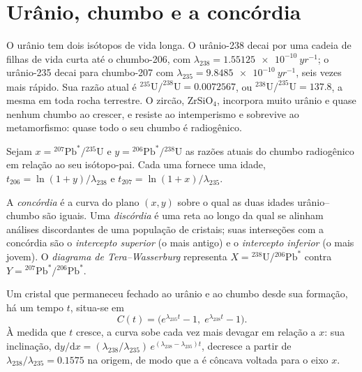 \section{Urânio, chumbo e a concórdia}\label{sec:b3:advanced-geochronology:upb}

O urânio tem dois isótopos de vida longa. O urânio-238 decai por uma cadeia de
filhas de vida curta até o chumbo-206, com $\lambda_{238} =
\qty{1.55125e-10}{yr^{-1}}$; o urânio-235 decai para chumbo-207 com $\lambda_{235}
= \qty{9.8485e-10}{yr^{-1}}$, seis vezes mais rápido. Sua razão atual é
$^{235}\mathrm{U}/^{238}\mathrm{U} = 0.0072567$, ou $^{238}\mathrm{U}/^{235}\mathrm{U}
= 137.8$, a mesma em toda rocha terrestre. O zircão, $\mathrm{ZrSiO_4}$, incorpora
muito urânio e quase nenhum chumbo ao crescer, e resiste ao intemperismo
e sobrevive ao metamorfismo: quase todo o seu chumbo é radiogênico.

Sejam $x = {}^{207}\mathrm{Pb}^*/{}^{235}\mathrm{U}$ e $y =
{}^{206}\mathrm{Pb}^*/{}^{238}\mathrm{U}$ as razões atuais do chumbo radiogênico
em relação ao seu isótopo-pai. Cada uma fornece uma idade, $t_{206} = \ln(1 + y)/\lambda_{238}$
e $t_{207} = \ln(1 + x)/\lambda_{235}$.

\begin{definition}
\label{def:b3:advanced-geochronology:concordia}
A \emph{concórdia} é a curva do plano $(x, y)$ sobre o qual
as duas idades urânio--chumbo são iguais. Uma \emph{discórdia}
é uma reta ao longo da qual se alinham análises discordantes de uma população de
cristais; suas interseções com a concórdia são o
\emph{intercepto superior} (o mais antigo) e o
\emph{intercepto inferior} (o mais jovem). O
\emph{diagrama de Tera--Wasserburg} representa
$X = {}^{238}\mathrm{U}/{}^{206}\mathrm{Pb}^*$ contra $Y =
{}^{207}\mathrm{Pb}^*/{}^{206}\mathrm{Pb}^*$.
\end{definition}

\begin{theorem}[A concórdia]\label{thm:b3:advanced-geochronology:concordia}
Um cristal que permaneceu fechado ao urânio e ao chumbo desde sua formação, há um
tempo $t$, situa-se em
\[
C(t) = \bigl(e^{\lambda_{235}t} - 1,\; e^{\lambda_{238}t} - 1\bigr).
\]
À medida que $t$ cresce, a curva sobe cada vez mais devagar em relação a $x$: sua inclinação,
$\mathrm dy/\mathrm dx = (\lambda_{238}/\lambda_{235})\,e^{(\lambda_{238} -
\lambda_{235})t}$, decresce a partir de $\lambda_{238}/\lambda_{235} = 0.1575$ na
origem, de modo que a  é côncava voltada para o eixo $x$.
\end{theorem}

